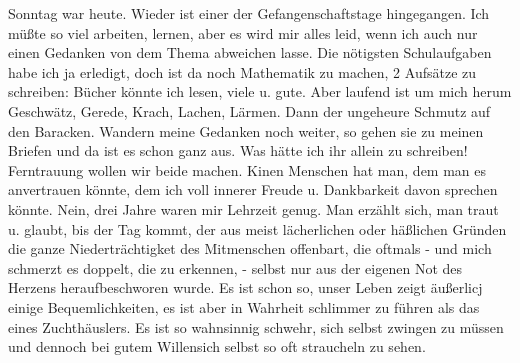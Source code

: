 \def\day{20. Februar 1944.}
\mktitle

Sonntag war heute.
Wieder ist einer der Gefangenschaftstage hingegangen.
Ich m\"{u}{\ss}te so viel arbeiten, lernen, aber es wird mir alles leid, wenn ich auch nur einen Gedanken von dem Thema abweichen lasse.
Die n\"{o}tigsten Schulaufgaben habe ich ja erledigt, doch ist da noch Mathematik zu machen, 2 Aufs\"{a}tze zu schreiben: B\"{u}cher k\"{o}nnte ich lesen, viele u. gute.
Aber laufend ist um mich herum Geschw\"{a}tz, Gerede, Krach, Lachen, L\"{a}rmen.
Dann der ungeheure Schmutz auf den Baracken.
Wandern meine Gedanken noch weiter, so gehen sie zu meinen Briefen und da ist es schon ganz aus.
Was h\"{a}tte ich ihr allein zu schreiben!
Ferntrauung wollen wir beide machen.
Kinen Menschen hat man, dem man es anvertrauen k\"{o}nnte, dem ich voll innerer Freude u. Dankbarkeit davon sprechen k\"{o}nnte.
Nein, drei Jahre waren mir Lehrzeit genug.
Man erz\"{a}hlt sich, man traut u. glaubt, bis der Tag kommt, der aus meist l\"{a}cherlichen oder h\"{a}{\ss}lichen Gr\"{u}nden die ganze Niedertr\"{a}chtigket des Mitmenschen offenbart, die oftmals - und mich schmerzt es doppelt, die zu erkennen, - selbst nur aus der eigenen  Not des Herzens heraufbeschworen wurde.
Es ist schon so, unser Leben zeigt \"{a}u{\ss}erlicj einige Bequemlichkeiten, es ist aber in Wahrheit schlimmer zu f\"{u}hren als das eines Zuchth\"{a}uslers.
Es ist so wahnsinnig schwehr, sich selbst zwingen zu m\"{u}ssen und dennoch bei gutem Willensich selbst so oft straucheln zu sehen.

\clearpage
